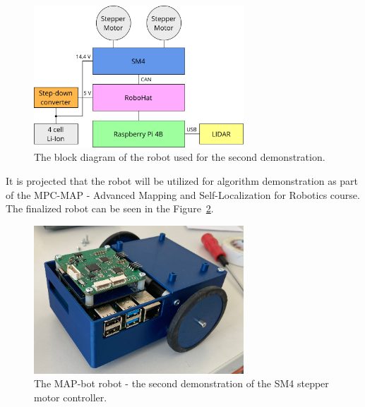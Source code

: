 \begin{figure}[H]
    \centering
    \includegraphics[width=0.7\textwidth]{obrazky/mapbot_block_diag}
    \caption{The block diagram of the robot used for the second demonstration.}
    \label{fig:mapbot_block}
\end{figure}

It is projected that the robot will be utilized for algorithm demonstration as part of the MPC-MAP - Advanced Mapping and Self-Localization for Robotics course.
The finalized robot can be seen in the Figure~\ref{fig:map_bot}.

\begin{figure}[H]
    \centering
    \includegraphics[width=0.7\textwidth]{obrazky/map_bot}
    \caption{The MAP-bot robot - the second demonstration of the SM4 stepper motor controller.}
    \label{fig:map_bot}
\end{figure}
